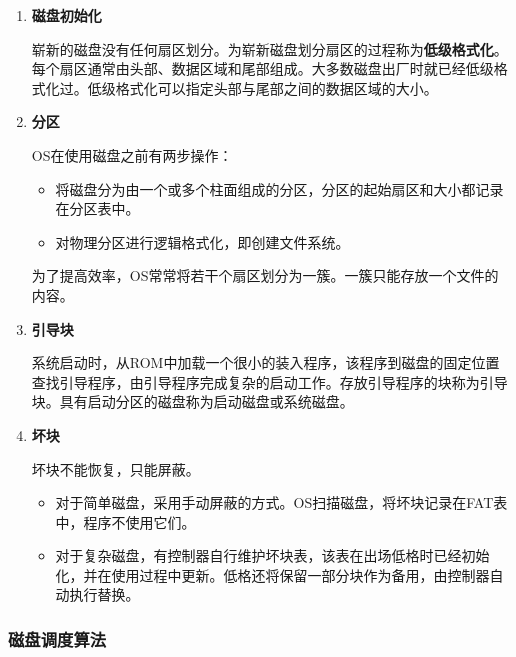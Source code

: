 \documentclass[12pt, a4paper, oneside]{ctexart}
\begin{document}
\begin{enumerate}
  \item {\bf 磁盘初始化}
  
  崭新的磁盘没有任何扇区划分。为崭新磁盘划分扇区的过程称为\textbf{低级格式化}。每个扇区通常由头部、数据区域和尾部组成。大多数磁盘出厂时就已经低级格式化过。低级格式化可以指定头部与尾部之间的数据区域的大小。

  \item {\bf 分区}
  
  OS在使用磁盘之前有两步操作：
  \begin{itemize}
    \item 将磁盘分为由一个或多个柱面组成的分区，分区的起始扇区和大小都记录在分区表中。
    \item 对物理分区进行逻辑格式化，即创建文件系统。
  \end{itemize}

  为了提高效率，OS常常将若干个扇区划分为一簇。一簇只能存放一个文件的内容。

  \item {\bf 引导块}
  
  系统启动时，从ROM中加载一个很小的装入程序，该程序到磁盘的固定位置查找引导程序，由引导程序完成复杂的启动工作。存放引导程序的块称为引导块。具有启动分区的磁盘称为启动磁盘或系统磁盘。

  \item {\bf 坏块}
  
  坏块不能恢复，只能屏蔽。
  \begin{itemize}
    \item 对于简单磁盘，采用手动屏蔽的方式。OS扫描磁盘，将坏块记录在FAT表中，程序不使用它们。
    \item 对于复杂磁盘，有控制器自行维护坏块表，该表在出场低格时已经初始化，并在使用过程中更新。低格还将保留一部分块作为备用，由控制器自动执行替换。
  \end{itemize}
\end{enumerate}

\subsubsection{磁盘调度算法}
\end{document}
